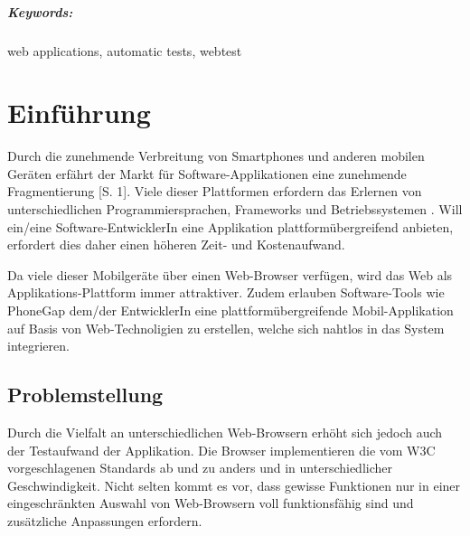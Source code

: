 \documentclass[a4paper,bibtotoc,oneside]{scrbook}
\begin{document}
\vfill
\paragraph*{Keywords:} web applications, automatic tests, webtest
\newpage


\tableofcontents\thispagestyle{empty}
\newpage

\setcounter{page}{1}

\chapter{Einführung}

Durch die zunehmende Verbreitung von Smartphones und anderen mobilen Geräten erfährt der Markt für Software-Applikationen eine zunehmende Fragmentierung \cite{smartphone}[S. 1]. Viele dieser Plattformen erfordern das Erlernen von unterschiedlichen Programmiersprachen, Frameworks und Betriebssystemen \cite{android}\cite{ios}. Will ein/eine Software-EntwicklerIn eine Applikation plattformübergreifend anbieten, erfordert dies daher einen höheren Zeit- und Kostenaufwand.

Da viele dieser Mobilgeräte über einen Web-Browser verfügen, wird das Web als Applikations-Plattform immer attraktiver. Zudem erlauben Software-Tools wie PhoneGap \cite{phonegap} dem/der EntwicklerIn eine plattformübergreifende Mobil-Applikation auf Basis von Web-Technoligien zu erstellen, welche sich nahtlos in das System integrieren. 

\section{Problemstellung}
Durch die Vielfalt an unterschiedlichen Web-Browsern erhöht sich jedoch auch der Testaufwand der Applikation. Die Browser implementieren die vom W3C vorgeschlagenen Standards ab und zu anders und in unterschiedlicher Geschwindigkeit. Nicht selten kommt es vor, dass gewisse Funktionen nur in einer eingeschränkten Auswahl von Web-Browsern voll funktionsfähig sind und zusätzliche Anpassungen erfordern. \cite{caniuse}
\end{document}
